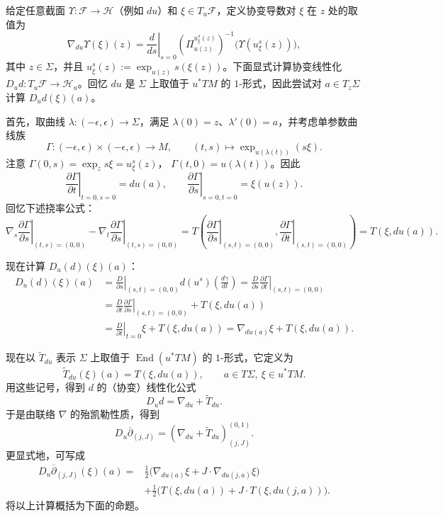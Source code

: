 给定任意截面 $\Upsilon:\mathcal F\to\mathcal H$（例如 $du$）和
$\xi\in T_u\mathcal F$，定义协变导数对 $\xi$ 在 $z$ 处的取值为
\[
 \nabla_{du}\Upsilon(\xi)(z)
 =\left.\frac d{ds}\right|_{s=0}
 \left(\Pi_{u(z)}^{u_\xi^s(z)}\right)^{-1}
 \bigl(\Upsilon(u_\xi^s(z))\bigr),
\]
其中 $z\in\Sigma$，并且
$u_\xi^s(z):=\exp_{u(z)}s(\xi(z))$。下面显式计算协变线性化
$D_ud:T_u\mathcal F\to\mathcal H_u$。回忆 $du$ 是 $\Sigma$ 上取值于
$u^*TM$ 的 $1$-形式，因此尝试对 $a\in T_z\Sigma$ 计算
$D_ud(\xi)(a)$。

首先，取曲线 $\lambda:(-\epsilon,\epsilon)\to\Sigma$，满足
$\lambda(0)=z$、$\lambda'(0)=a$，并考虑单参数曲线族
\[
 \Gamma:(-\epsilon,\epsilon)\times(-\epsilon,\epsilon)
 \longrightarrow M,
 \qquad
 (t,s)\longmapsto\exp_{u(\lambda(t))}(s\xi).
\]
注意
$\Gamma(0,s)=\exp_zs\xi=u_\xi^s(z)$，
$\Gamma(t,0)=u(\lambda(t))$。因此
\[
 \left.\frac{\partial\Gamma}{\partial t}\right|_{t=0,s=0}=du(a),
 \qquad
 \left.\frac{\partial\Gamma}{\partial s}\right|_{s=0,t=0}=\xi(u(z)).
\]
回忆下述挠率公式：
\[
 \left.\nabla_s\frac{\partial\Gamma}{\partial s}
 \right|_{(t,s)=(0,0)}
 -\left.\nabla_t\frac{\partial\Gamma}{\partial s}
 \right|_{(t,s)=(0,0)}
 =T\left(
 \left.\frac{\partial\Gamma}{\partial s}\right|_{(s,t)=(0,0)},
 \left.\frac{\partial\Gamma}{\partial t}\right|_{(s,t)=(0,0)}
 \right)
 =T(\xi,du(a)).
\]

现在计算 $D_u(d)(\xi)(a)$：
\begin{align*}
 D_u(d)(\xi)(a)
 &=\left.\frac D{\partial s}\right|_{(s,t)=(0,0)}
 d(u^s)\left(\frac{d\gamma}{dt}\right)
 =\left.\frac D{\partial s}\frac{\partial\Gamma}{\partial t}
 \right|_{(s,t)=(0,0)}\\
 &=\left.\frac D{\partial t}\frac{\partial\Gamma}{\partial s}
 \right|_{(s,t)=(0,0)}+T(\xi,du(a))\\
 &=\left.\frac D{\partial t}\right|_{t=0}\xi+T(\xi,du(a))
 =\nabla_{du(a)}\xi+T(\xi,du(a)).
\end{align*}

现在以 $\widetilde T_{du}$ 表示 $\Sigma$ 上取值于
$\operatorname{End}(u^*TM)$ 的 $1$-形式，它定义为
\[
 \widetilde T_{du}(\xi)(a)=T(\xi,du(a)),
 \qquad a\in T\Sigma,\ \xi\in u^*TM.
\]
用这些记号，得到 $d$ 的（协变）线性化公式
\begin{equation}
 D_ud=\nabla_{du}+\widetilde T_{du}.
 \label{eq:covariant-linearization-d}
\end{equation}
于是由联络 $\nabla$ 的殆凯勒性质，得到
\[
 D_u\overline\partial_{(j,J)}
 =(\nabla_{du}+\widetilde T_{du})^{(0,1)}_{(j,J)}.
\]
更显式地，可写成
\begin{equation}
 \begin{split}
 D_u\overline\partial_{(j,J)}(\xi)(a)
 ={}&\frac12\bigl(\nabla_{du(a)}\xi
 +J\cdot\nabla_{du(j,a)}\xi\bigr)\\
 &+\frac12\bigl(T(\xi,du(a))
 +J\cdot T(\xi,du(j,a))\bigr).
 \end{split}
 \label{eq:explicit-linearization-dbar-jj}
\end{equation}
将以上计算概括为下面的命题。

